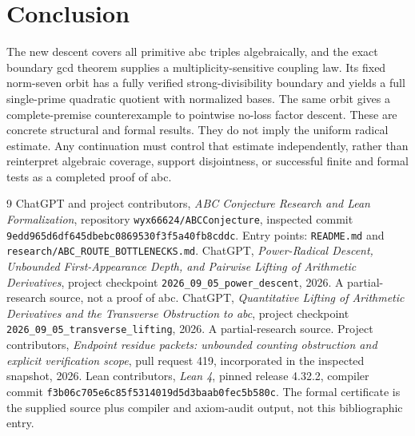 \documentclass[11pt]{article}
\theoremstyle{definition}
\theoremstyle{remark}
\begin{document}
\section{Conclusion}
The new descent covers all primitive abc triples algebraically, and the exact boundary gcd theorem supplies a multiplicity-sensitive coupling law. Its fixed norm-seven orbit has a fully verified strong-divisibility boundary and yields a full single-prime quadratic quotient with normalized bases. The same orbit gives a complete-premise counterexample to pointwise no-loss factor descent. These are concrete structural and formal results. They do not imply the uniform radical estimate. Any continuation must control that estimate independently, rather than reinterpret algebraic coverage, support disjointness, or successful finite and formal tests as a completed proof of abc.

\begin{thebibliography}{9}
 ChatGPT and project contributors, \emph{ABC Conjecture Research and Lean Formalization}, repository \texttt{wyx66624/ABCConjecture}, inspected commit \texttt{9edd965d6df645dbebc0869530f3f5a40fb8cddc}. Entry points: \texttt{README.md} and \texttt{research/ABC\_ROUTE\_BOTTLENECKS.md}.
 ChatGPT, \emph{Power-Radical Descent, Unbounded First-Appearance Depth, and Pairwise Lifting of Arithmetic Derivatives}, project checkpoint \texttt{2026\_09\_05\_power\_descent}, 2026. A partial-research source, not a proof of abc.
 ChatGPT, \emph{Quantitative Lifting of Arithmetic Derivatives and the Transverse Obstruction to abc}, project checkpoint \texttt{2026\_09\_05\_transverse\_lifting}, 2026. A partial-research source.
 Project contributors, \emph{Endpoint residue packets: unbounded counting obstruction and explicit verification scope}, pull request 419, incorporated in the inspected snapshot, 2026.
 Lean contributors, \emph{Lean 4}, pinned release 4.32.2, compiler commit \texttt{f3b06c705e6c85f5314019d5d3baab0fec5b580c}. The formal certificate is the supplied source plus compiler and axiom-audit output, not this bibliographic entry.
\end{thebibliography}
\end{document}
